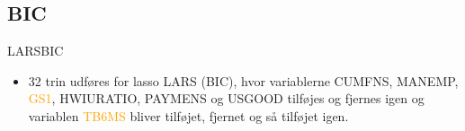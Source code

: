 \subsection{BIC}
\begin{frame}{LARS}{BIC}
\begin{table}
\center
{}
\caption{Værdien af $f_\text{BIC}$, antallet af parametre, BIC, justeret R$^2$  og log-likelihood for LARS og lasso LARS.} \label{tab:bic_lars}
\end{table}
\begin{itemize}
\item 32 trin udføres for lasso LARS (BIC), hvor variablerne \textcolor{chartreuse4}{CUMFNS}, \textcolor{blue3}{MANEMP}, \textcolor{orange}{GS1}, \textcolor{blue3}{HWIURATIO}, \textcolor{blue3}{PAYMENS} og \textcolor{blue3}{USGOOD} tilføjes og fjernes igen og variablen \textcolor{orange}{TB6MS} bliver tilføjet, fjernet og så tilføjet igen. 
\end{itemize}
\end{frame}


